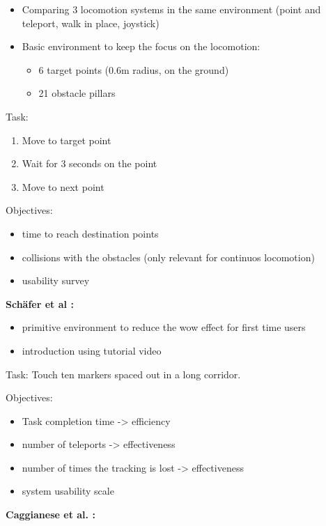 \begin{itemize}
  \item Comparing 3 locomotion systems in the same environment (point and teleport, walk in place, joystick)
  \item Basic environment to keep the focus on the locomotion:
  \begin{itemize}
    \item 6 target points (0.6m radius, on the ground)
    \item 21 obstacle pillars
  \end{itemize}
\end{itemize}


Task:
\begin{enumerate}
  \item Move to target point
  \item Wait for 3 seconds on the point
  \item Move to next point
\end{enumerate}


Objectives:
\begin{itemize}
  \item time to reach destination points
  \item collisions with the obstacles (only relevant for continuos locomotion)
  \item usability survey
\end{itemize}



\textbf{Schäfer et al \cite{Schafer2021}:}
\begin{itemize}
  \item primitive environment to reduce the wow effect for first time users
  \item introduction using tutorial video
\end{itemize}


Task: Touch ten markers spaced out in a long corridor.


Objectives:
\begin{itemize}
  \item Task completion time -> efficiency
  \item number of teleports -> effectiveness
  \item number of times the tracking is lost -> effectiveness
  \item system usability scale
\end{itemize}




\textbf{Caggianese et al. \cite{Caggianese}:}

